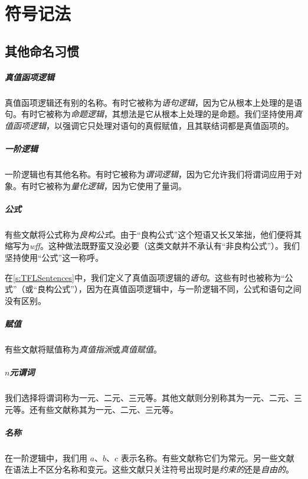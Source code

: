 
\chapter{符号记法}
\label{app.notation}

\section{其他命名习惯}

\paragraph{真值函项逻辑} 真值函项逻辑还有别的名称。有时它被称为\emph{语句逻辑}，因为它从根本上处理的是语句。有时它被称为\emph{命题逻辑}，其想法是它从根本上处理的是命题。我们坚持使用\emph{真值函项逻辑}，以强调它只处理对语句的真假赋值，且其联结词都是真值函项的。

\paragraph{一阶逻辑} 一阶逻辑也有其他名称。有时它被称为\emph{谓词逻辑}，因为它允许我们将谓词应用于对象。有时它被称为\emph{量化逻辑}，因为它使用了量词。

\paragraph{公式} 有些文献将公式称为\emph{良构公式}。由于“良构公式”这个短语又长又笨拙，他们便将其缩写为\emph{wff}。这种做法既野蛮又没必要（这类文献并不承认有“非良构公式”）。我们坚持使用“公式”这一称呼。

在\cref{s:TFLSentences}中，我们定义了真值函项逻辑的\emph{语句}。这些有时也被称为“公式”（或“良构公式”），因为在真值函项逻辑中，与一阶逻辑不同，公式和语句之间没有区别。

\paragraph{赋值} 有些文献将赋值称为\emph{真值指派}或\emph{真值赋值}。

\paragraph{$n$元谓词} 我们选择将谓词称为一元、二元、三元等。其他文献则分别称其为一元、二元、三元等。还有些文献称其为一元、二元、三元等。

\paragraph{名称} 在一阶逻辑中，我们用 $a$、$b$、$c$ 表示名称。有些文献称它们为常元。另一些文献在语法上不区分名称和变元。这些文献只关注符号出现时是\emph{约束的}还是\emph{自由的}。

